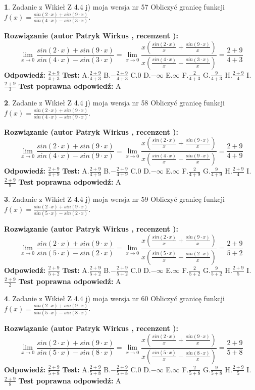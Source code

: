 \documentclass[12pt, a4paper]{article}
\theoremstyle{definition} %
\newtheorem{zad}{}
\newcommand{\zadStart}[1]{\begin{zad}#1\newline}
\newcommand{\zadStop}{\end{zad}}
\newcommand{\rozwStart}[2]{\noindent \textbf{Rozwiązanie (autor #1 , recenzent #2): }\newline}
\newcommand{\rozwStop}{\newline}
\newcommand{\odpStart}{\noindent \textbf{Odpowiedź:}\newline}
\newcommand{\odpStop}{\newline}
\newcommand{\testStart}{\noindent \textbf{Test:}\newline}
\newcommand{\testStop}{\newline}
\newcommand{\kluczStart}{\noindent \textbf{Test poprawna odpowiedź:}\newline}
\newcommand{\kluczStop}{\newline}
\begin{document}
\zadStart{Zadanie z Wikieł Z 4.4 j) moja wersja nr 57}
Obliczyć granicę funkcji $f(x)=\frac{sin(2\cdot x) +sin(9\cdot x)}{sin(4\cdot x) -sin(3\cdot x)}$.
\zadStop
\rozwStart{Patryk Wirkus}{}
$$\lim\limits_{x\to 0}\frac{sin(2\cdot x) +sin(9\cdot x)}{sin(4\cdot x) -sin(3\cdot x)}=\lim\limits_{x\to 0}\frac{x(\frac{sin(2\cdot x)}{x}+\frac{sin(9\cdot x)}{x})}{x(\frac{sin(4\cdot x)}{x}-\frac{sin(3\cdot x)}{x})}=\frac{2+9}{4+3}$$
\rozwStop
\odpStart
$\frac{2+9}{4+3}$
\odpStop
\testStart
A.$\frac{2+9}{4+3}$
B.$-\frac{2+9}{4+3}$
C.$0$
D.$-\infty$
E.$\infty$
F.$\frac{2}{4+3}$
G.$\frac{9}{4+3}$
H.$\frac{2+9}{4}$
I.$\frac{2+9}{3}$
\testStop
\kluczStart
A
\kluczStop



\zadStart{Zadanie z Wikieł Z 4.4 j) moja wersja nr 58}
Obliczyć granicę funkcji $f(x)=\frac{sin(2\cdot x) +sin(9\cdot x)}{sin(4\cdot x) -sin(9\cdot x)}$.
\zadStop
\rozwStart{Patryk Wirkus}{}
$$\lim\limits_{x\to 0}\frac{sin(2\cdot x) +sin(9\cdot x)}{sin(4\cdot x) -sin(9\cdot x)}=\lim\limits_{x\to 0}\frac{x(\frac{sin(2\cdot x)}{x}+\frac{sin(9\cdot x)}{x})}{x(\frac{sin(4\cdot x)}{x}-\frac{sin(9\cdot x)}{x})}=\frac{2+9}{4+9}$$
\rozwStop
\odpStart
$\frac{2+9}{4+9}$
\odpStop
\testStart
A.$\frac{2+9}{4+9}$
B.$-\frac{2+9}{4+9}$
C.$0$
D.$-\infty$
E.$\infty$
F.$\frac{2}{4+9}$
G.$\frac{9}{4+9}$
H.$\frac{2+9}{4}$
I.$\frac{2+9}{9}$
\testStop
\kluczStart
A
\kluczStop



\zadStart{Zadanie z Wikieł Z 4.4 j) moja wersja nr 59}
Obliczyć granicę funkcji $f(x)=\frac{sin(2\cdot x) +sin(9\cdot x)}{sin(5\cdot x) -sin(2\cdot x)}$.
\zadStop
\rozwStart{Patryk Wirkus}{}
$$\lim\limits_{x\to 0}\frac{sin(2\cdot x) +sin(9\cdot x)}{sin(5\cdot x) -sin(2\cdot x)}=\lim\limits_{x\to 0}\frac{x(\frac{sin(2\cdot x)}{x}+\frac{sin(9\cdot x)}{x})}{x(\frac{sin(5\cdot x)}{x}-\frac{sin(2\cdot x)}{x})}=\frac{2+9}{5+2}$$
\rozwStop
\odpStart
$\frac{2+9}{5+2}$
\odpStop
\testStart
A.$\frac{2+9}{5+2}$
B.$-\frac{2+9}{5+2}$
C.$0$
D.$-\infty$
E.$\infty$
F.$\frac{2}{5+2}$
G.$\frac{9}{5+2}$
H.$\frac{2+9}{5}$
I.$\frac{2+9}{2}$
\testStop
\kluczStart
A
\kluczStop



\zadStart{Zadanie z Wikieł Z 4.4 j) moja wersja nr 60}
Obliczyć granicę funkcji $f(x)=\frac{sin(2\cdot x) +sin(9\cdot x)}{sin(5\cdot x) -sin(8\cdot x)}$.
\zadStop
\rozwStart{Patryk Wirkus}{}
$$\lim\limits_{x\to 0}\frac{sin(2\cdot x) +sin(9\cdot x)}{sin(5\cdot x) -sin(8\cdot x)}=\lim\limits_{x\to 0}\frac{x(\frac{sin(2\cdot x)}{x}+\frac{sin(9\cdot x)}{x})}{x(\frac{sin(5\cdot x)}{x}-\frac{sin(8\cdot x)}{x})}=\frac{2+9}{5+8}$$
\rozwStop
\odpStart
$\frac{2+9}{5+8}$
\odpStop
\testStart
A.$\frac{2+9}{5+8}$
B.$-\frac{2+9}{5+8}$
C.$0$
D.$-\infty$
E.$\infty$
F.$\frac{2}{5+8}$
G.$\frac{9}{5+8}$
H.$\frac{2+9}{5}$
I.$\frac{2+9}{8}$
\testStop
\kluczStart
A
\kluczStop
\end{document}
